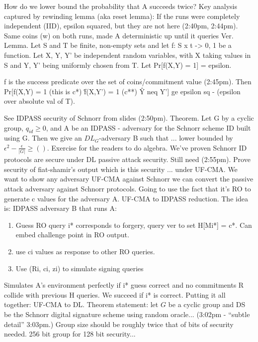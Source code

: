 How do we lower bound the probability that A succeeds twice? Key analysis captured by rewinding lemma (aka reset lemma):
If the runs were completely independent (IID), epsilon squared, but they are not here (2:40pm, 2:44pm).
Same coins (w) on both runs, made A deterministic up until it queries Ver.
Lemma. Let S and T be finite, non-empty sets and let f: S x t -> {0, 1} be a function. Let X, Y, Y' be independent random variables, with X taking values in S and Y, Y' being uniformly chosen from T. Let Pr[f(X,Y) = 1] = epsilon.

f is the success predicate over the set of coins/commitment value (2:45pm).
Then Pr[f(X,Y) = 1 (this is c*) \^ f(X,Y') = 1 (c**) \^ Y neq Y'] ge epsilon sq - (epsilon over absolute val of T).

See IDPASS security of Schnorr from slides (2:50pm).
Theorem. Let G by a cyclic group, $q_{id} \ge 0$, and A be an IDPASS - adversary for the Schnorr scheme ID built using G. Then we give an $DL_G$-adversary B such that
...
lower bounded by $\epsilon^2 - \frac{\epsilon}{|G|} \ge ()$.
Exercise for the readers to do algebra. 
We've proven Schnorr ID protocols are secure under DL passive attack security. Still need (2:55pm).
Prove security of fiat-shamir's output which is this security ... under UF-CMA.
We want to show any adversary UF-CMA against Schnorr we can convert the passive attack adversary against Schnorr protocols.
Going to use the fact that it's RO to generate c values for the adversary A. UF-CMA to IDPASS reduction. The idea is:
IDPASS adversary B that runs A:
\begin{enumerate}
    \item Guess RO query i* corresponds to forgery, query ver to set H[Mi*] = c*. Can embed challenge point in RO output.
    \item use ci values as response to other RO queries.
    \item Use (Ri, ci, zi) to simulate signing queries
\end{enumerate}

Simulates A's environment perfectly if i* guess correct and no commitments R collide with previous H queries.
We succeed if i* is correct.
Putting it all together: UF-CMA to DL.
Theorem statement: let $G$ be a cyclic group and DS be the Schnorr digital signature scheme using random oracle... (3:02pm - ``subtle detail'' 3:03pm.)
Group size should be roughly twice that of bits of security needed. 256 bit group for 128 bit security...
